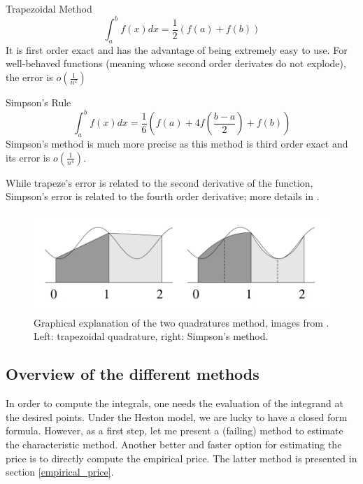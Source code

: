\begin{theoreme}{Trapezoidal Method}
$$\int_a^b f(x) dx = \frac 1 2 (f(a) + f(b))$$
It is first order exact and has the advantage of being extremely easy to use. For well-behaved functions (meaning whose second order derivates do not explode), the error is $ o (\frac 1 {n^2})$
\end{theoreme}


\begin{theoreme}{Simpson's Rule}
$$\int_a^b f(x) dx = \frac 1 6 (f(a) + 4 f(\frac{b-a}{2}) + f(b))$$
Simpson's method is much more precise as this method is third order exact and its error is $o (\frac 1 {n^4})$.
\end{theoreme}

\begin{remarque}
While trapeze's error is related to the second derivative of the function, Simpson's error is related to the fourth order derivative; more details in \cite{annalisa}. 
\end{remarque}


\begin{figure}
\centering
\includegraphics[width = 0.5 \textwidth]{../addition_part/images/integration_fft/numerical_integration.jpg}
\caption{Graphical explanation of the two quadratures method, images from \cite{annalisa}. Left: trapezoidal quadrature, right: Simpson's method.}
\end{figure}









\subsection{Overview of the different methods}
In order to compute the integrals, one needs the evaluation of the integrand at the desired points. Under the Heston model, we are lucky to have a closed form formula. However, as a first step, let me present a (failing) method to estimate the characteristic method. Another better and faster option for estimating the price is to directly compute the empirical price. The latter method is presented in section \ref{empirical_price}.

